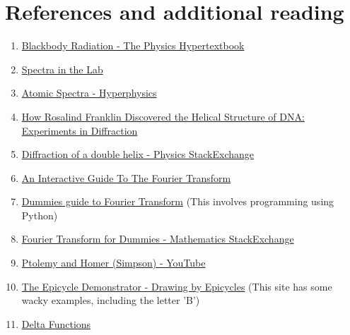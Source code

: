 \newpage

\section*{References and additional reading}

\begin{enumerate}
\item \href{https://physics.info/planck/}{Blackbody Radiation - The Physics Hypertextbook}
\item \href{https://www.ifa.hawaii.edu/~barnes/ASTR110L_F05/spectralab.html}{Spectra in the Lab}
\item \href{http://hyperphysics.phy-astr.gsu.edu/hbase/quantum/atspect.html}{Atomic Spectra - Hyperphysics}
\item \href{https://pdfs.semanticscholar.org/8ccd/de212e9059a35c111704073aea2443984614.pdf}{How Rosalind Franklin Discovered the Helical Structure of DNA: Experiments in Diffraction}
\item \href{https://physics.stackexchange.com/questions/383138/diffraction-pattern-due-to-double-helix?rq=1}{Diffraction of a double helix - Physics StackExchange}
\item \href{https://betterexplained.com/articles/an-interactive-guide-to-the-fourier-transform/}{An Interactive Guide To The Fourier Transform}
\item \href{https://nipunbatra.github.io/blog/2016/FT.html}{Dummies guide to Fourier Transform} (This involves programming using Python)
\item \href{https://math.stackexchange.com/questions/1002/fourier-transform-for-dummies}{Fourier Transform for Dummies - Mathematics StackExchange}
\item \href{https://www.youtube.com/watch?v=QVuU2YCwHjw}{Ptolemy and Homer (Simpson) - YouTube}
\item \href{http://brettcvz.github.io/epicycles/}{The Epicycle Demonstrator - Drawing by Epicycles} (This site has some wacky examples, including the letter 'B')
\item \href{http://www.cchem.berkeley.edu/chem120a/extra/delta_functions.pdf}{Delta Functions}
\end{enumerate}


\newpage